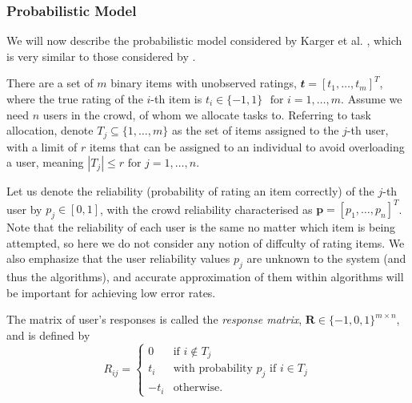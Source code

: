 \documentclass[12pt]{article}
\numberwithin{equation}{section}
\begin{document}
\subsubsection{Probabilistic Model}
\label{subsubsec:crowdsourcingProbabilisticModel}

We will now describe the probabilistic model considered by Karger et al. \cite{KOS13}, which is very similar to those considered by \cite{GKM11,DDK+13}.

There are a set of $m$ binary items with unobserved ratings, $\mathbfit{t} = [t_{1},\dots,t_{m}]^{T}$, where the true rating of the $i$-th item is $t_{i} \in \{-1,1\}$ $\text{ for } i=1,\dots,m$. Assume we need $n$ users in the crowd, of whom we allocate tasks to. Referring to task allocation, denote $T_{j} \subseteq \{1,\dots,m\}$ as the set of items assigned to the $j$-th user, with a limit of $r$ items that can be assigned to an individual to avoid overloading a user, meaning $\left\vert{T_{j}}\right\vert \le r \text{ for } j=1,\dots,n$.

Let us denote the reliability (probability of rating an item correctly) of the $j$-th user by $p_{j} \in [0,1]$, with the crowd reliability characterised as $\mathbf{p} = [p_{1},\dots,p_{n}]^{T}$. Note that the reliability of each user is the same no matter which item is being attempted, so here we do not consider any notion of diffculty of rating items. We also emphasize that the user reliability values $p_{j}$ are unknown to the system (and thus the algorithms), and accurate approximation of them within algorithms will be important for achieving low error rates.

The matrix of user's responses is called the \textit{response matrix}, $\mathbf{R} \in \{-1,0,1\}^{m \times n}$, and is defined by
\begin{equation}
	R_{ij} =
	\begin{cases}
		0 & \text{if } i \not \in T_{j}\\
		t_{i} & \text{with probability }  p_{j} \text{ if } i \in T_{j}\\
		-t_{i} & \text{otherwise}.
	\end{cases}
\end{equation}
\end{document}
